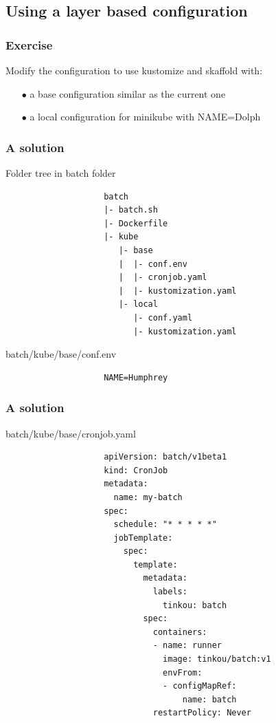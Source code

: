 \subsection{Using a layer based configuration}	
	
	\begin{frame}
		\frametitle{Exercise}
		
		Modify the configuration to use kustomize and skaffold with:
		\begin{itemize}
			\item[$\bullet$] a base configuration similar as the current one
			\item[$\bullet$] a local configuration for minikube with NAME=Dolph
		\end{itemize}
	\end{frame}
	
	\begin{frame}[fragile]
		\frametitle{A solution}
		
		\begin{block}{Folder tree in batch folder}
			\begin{small}
				\begin{verbatim}
					batch
					|- batch.sh
					|- Dockerfile
					|- kube
					   |- base
					   |  |- conf.env
					   |  |- cronjob.yaml
					   |  |- kustomization.yaml
					   |- local
					      |- conf.yaml
					      |- kustomization.yaml
				\end{verbatim}
			\end{small}
		\end{block}

		\begin{block}{batch/kube/base/conf.env}
			\begin{small}
				\begin{verbatim}
					NAME=Humphrey
				\end{verbatim}
			\end{small}
		\end{block}

	\end{frame}
	
	\begin{frame}[fragile]
		\frametitle{A solution}
				
		\begin{block}{batch/kube/base/cronjob.yaml}
			\begin{tiny}
				\begin{verbatim}
					apiVersion: batch/v1beta1
					kind: CronJob
					metadata:
					  name: my-batch
					spec:
					  schedule: "* * * * *"
					  jobTemplate:
					    spec:
					      template:
					        metadata:
					          labels:
					            tinkou: batch
					        spec:
					          containers:
					          - name: runner
					            image: tinkou/batch:v1
					            envFrom:
					            - configMapRef:
					                name: batch
					          restartPolicy: Never
				\end{verbatim}
			\end{tiny}
		\end{block}
	\end{frame}
	
